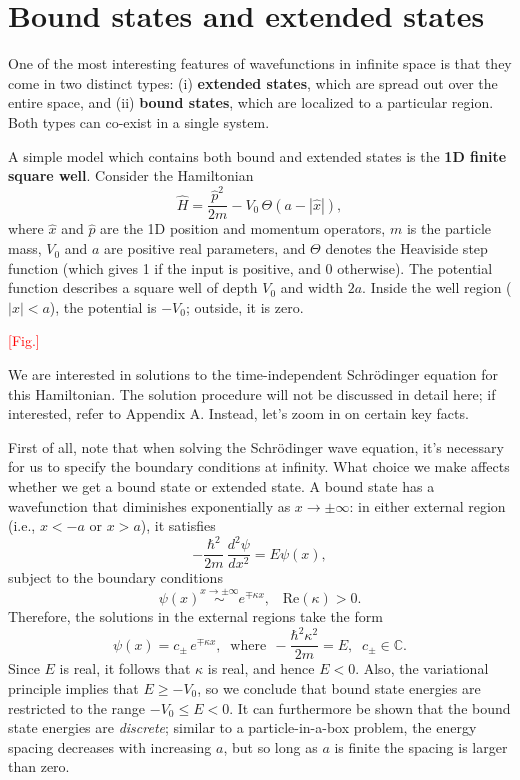 \documentclass[pra,12pt]{revtex4}
\begin{document}
\section{Bound states and extended states}

One of the most interesting features of wavefunctions in infinite
space is that they come in two distinct types: (i) \textbf{extended
  states}, which are spread out over the entire space, and (ii)
\textbf{bound states}, which are localized to a particular region.
Both types can co-exist in a single system.

A simple model which contains both bound and extended states is the
\textbf{1D finite square well}.  Consider the Hamiltonian
$$\hat{H} = \frac{\hat{p}^2}{2m} - V_0 \,\Theta(a -|\hat{x}|),$$
where $\hat{x}$ and $\hat{p}$ are the 1D position and momentum
operators, $m$ is the particle mass, $V_0$ and $a$ are positive real
parameters, and $\Theta$ denotes the Heaviside step function (which
gives 1 if the input is positive, and 0 otherwise).  The potential
function describes a square well of depth $V_0$ and width $2a$.
Inside the well region ($|x| < a$), the potential is $-V_0$; outside,
it is zero.

\textcolor{red}{[Fig.]}

We are interested in solutions to the time-independent Schr\"odinger
equation for this Hamiltonian.  The solution procedure will not be
discussed in detail here; if interested, refer to Appendix A.
Instead, let's zoom in on certain key facts.

First of all, note that when solving the Schr\"odinger wave equation,
it's necessary for us to specify the boundary conditions at infinity.
What choice we make affects whether we get a bound state or extended
state.  A bound state has a wavefunction that diminishes exponentially
as $x \rightarrow \pm\infty$: in either external region (i.e., $x <
-a$ or $x > a$), it satisfies
$$-\frac{\hbar^2}{2m}\,\frac{d^2\psi}{dx^2} = E \psi(x),$$
subject to the boundary conditions
$$\psi(x) \overset{x\rightarrow\pm\infty}{\sim} e^{\mp\kappa x}, \;\;\;\mathrm{Re}(\kappa) > 0.$$
Therefore, the solutions in the external regions take the form
$$\psi(x) = c_\pm\, e^{\mp\kappa x}, \;\;\mathrm{where}\;\, -\frac{\hbar^2\kappa^2}{2m} = E, \;\; c_\pm \in \mathbb{C}.$$
Since $E$ is real, it follows that $\kappa$ is real, and hence $E <
0$.  Also, the variational principle implies that $E \ge -V_0$, so we
conclude that bound state energies are restricted to the range $-V_0
\le E < 0$.  It can furthermore be shown that the bound state energies
are \textit{discrete}; similar to a particle-in-a-box problem, the
energy spacing decreases with increasing $a$, but so long as $a$ is
finite the spacing is larger than zero.
\end{document}
